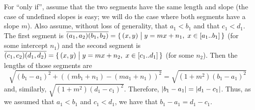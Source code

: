 \begin{exercises}
\begin{answer}
     For ``only if'', assume that
     the two segments have the same length and slope
     (the case of undefined slopes is easy; we will do the case where both
     segments have a slope \( m \)).
     Also assume, without loss of generality, that $a_1<b_1$ and that
     $c_1<d_1$.
     The first segment is
     \( \overline{(a_1,a_2)(b_1,b_2)}=
     \mbox{$\{\,(x,y)\bigm| y=mx+n_1,\; x\in [a_1..b_1]\,\}$} \)
     (for some intercept $n_1$)
     and the second segment is \( \overline{(c_1,c_2)(d_1,d_2)}=
     \mbox{$\{\,(x,y)\bigm| y=mx+n_2,\; x\in [c_1..d_1]\,\}$} \)
     (for some $n_2$).
     Then the lengths of those segments are
     \begin{equation*}
     \sqrt{(b_1-a_1)^2+((mb_1+n_1)-(ma_1+n_1))^2}
       =\sqrt{(1+m^2)(b_1-a_1)^2}
     \end{equation*}
     and, similarly, \( \sqrt{(1+m^2)(d_1-c_1)^2} \).
     Therefore, \( |b_1-a_1|=|d_1-c_1| \).
     Thus, as we assumed that \( a_1<b_1 \) and \( c_1<d_1 \), we have
     that \( b_1-a_1=d_1-c_1 \).


\end{answer}
\end{exercises}

